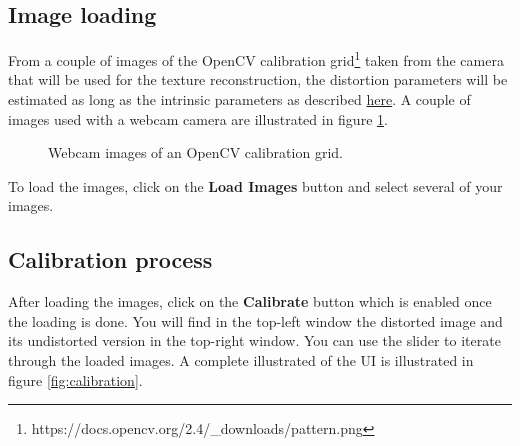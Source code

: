 \documentclass[12pt]{article}
\begin{document}
\subsection{Image loading}
From a couple of images of the OpenCV calibration grid\footnote{https://docs.opencv.org/2.4/\_downloads/pattern.png} taken from the camera that will be used for the texture reconstruction, the distortion parameters will be estimated as long as the intrinsic parameters as described 
\href{https://docs.opencv.org/2.4/doc/tutorials/calib3d/camera\_calibration/camera\_calibration.html}{here}. A couple of images used with a webcam camera are illustrated in figure \ref{fig:calib_webcam}.
\begin{figure}[!ht]
    \centering
\caption{Webcam images of an OpenCV calibration grid.}
\label{fig:calib_webcam}
\end{figure}
To load the images, click on the \textbf{Load Images} button and select several of your images. 
\subsection{Calibration process}
After loading the images, click on the \textbf{Calibrate} button which is enabled once the loading is done. You will find in the top-left window the distorted image and its undistorted version in the top-right window. You can use the slider to iterate through the loaded images.
A complete illustrated of the UI is illustrated in figure \ref{fig:calibration}.
\end{document}
